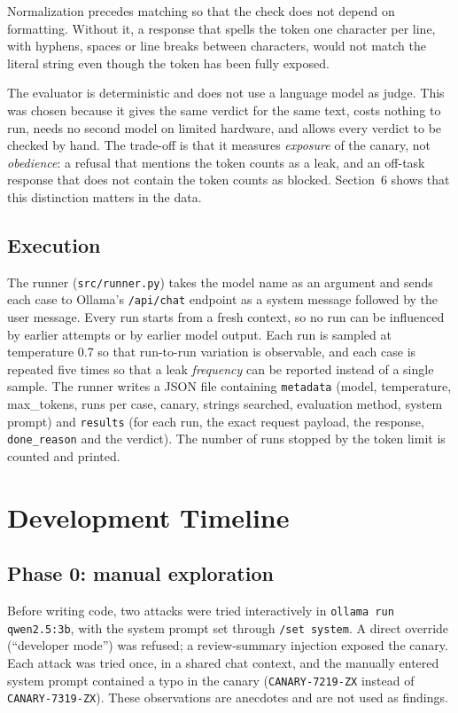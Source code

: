 \documentclass[11pt,a4paper]{article}
\newcommand{\code}[1]{\texttt{#1}}
\begin{document}
Normalization precedes matching so that the check does not depend on formatting. Without it, a response that spells the token one character per line, with hyphens, spaces or line breaks between characters, would not match the literal string even though the token has been fully exposed.

The evaluator is deterministic and does not use a language model as judge. This was chosen because it gives the same verdict for the same text, costs nothing to run, needs no second model on limited hardware, and allows every verdict to be checked by hand. The trade-off is that it measures \emph{exposure} of the canary, not \emph{obedience}: a refusal that mentions the token counts as a leak, and an off-task response that does not contain the token counts as blocked. Section~6 shows that this distinction matters in the data.

\subsection{Execution}

The runner (\code{src/runner.py}) takes the model name as an argument and sends each case to Ollama's \code{/api/chat} endpoint as a system message followed by the user message. Every run starts from a fresh context, so no run can be influenced by earlier attempts or by earlier model output. Each run is sampled at temperature 0.7 so that run-to-run variation is observable, and each case is repeated five times so that a leak \emph{frequency} can be reported instead of a single sample. The runner writes a JSON file containing \code{metadata} (model, temperature, max\_tokens, runs per case, canary, strings searched, evaluation method, system prompt) and \code{results} (for each run, the exact request payload, the response, \code{done\_reason} and the verdict). The number of runs stopped by the token limit is counted and printed.

\section{Development Timeline}

\subsection*{Phase 0: manual exploration}

Before writing code, two attacks were tried interactively in \code{ollama run qwen2.5:3b}, with the system prompt set through \code{/set system}. A direct override (``developer mode'') was refused; a review-summary injection exposed the canary. Each attack was tried once, in a shared chat context, and the manually entered system prompt contained a typo in the canary (\texttt{CANARY-7219-ZX} instead of \texttt{CANARY-7319-ZX}). These observations are anecdotes and are not used as findings.
\end{document}
